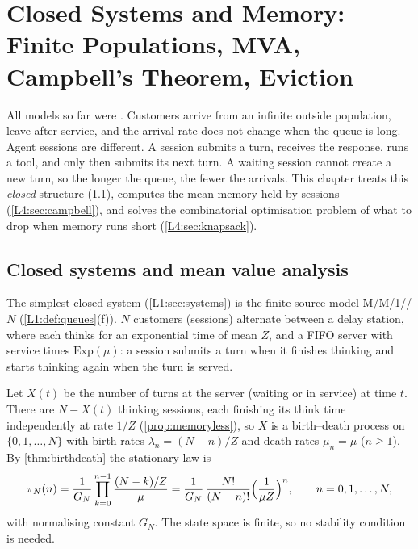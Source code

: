 \chapter{Closed Systems and Memory: Finite Populations, MVA, Campbell's Theorem, Eviction}\label{sec:L4}

All models so far were . Customers arrive from an infinite
outside population, leave after service, and the arrival rate does not change
when the queue is long. Agent sessions are different. A session submits a turn,
receives the response, runs a tool, and only then submits its next turn. A
waiting session cannot create a new turn, so the longer the queue, the fewer the
arrivals. This chapter treats this \emph{closed} structure
(\cref{L4:sec:closed}), computes the mean memory held by sessions
(\cref{L4:sec:campbell}), and solves the combinatorial optimisation problem of
what to drop when memory runs short (\cref{L4:sec:knapsack}).

\section{Closed systems and mean value analysis}\label{L4:sec:closed}

The simplest closed system (\cref{L1:sec:systems}) is the finite-source model
M/M/1//$N$ (\cref{L1:def:queues}(f)). $N$ customers (sessions) alternate between a
delay station, where each thinks for an exponential time of mean $Z$, and a FIFO
server with service times $\mathrm{Exp}(\mu)$: a session submits a turn when it
finishes thinking and starts thinking again when the turn is served.


Let $X(t)$ be the number of turns at the server (waiting or in service) at time
$t$. There are $N-X(t)$ thinking sessions, each finishing its think time
independently at rate $1/Z$ (\cref{prop:memoryless}), so $X$ is a birth--death
process on $\{0,1,\dots,N\}$ with birth rates $\lambda_n=(N-n)/Z$ and death
rates $\mu_n=\mu$ ($n\ge1$). By \cref{thm:birthdeath} the stationary law is
\begin{equation}\label{L4:eq:piN}
  \pi_N(n)=\frac{1}{G_N}\prod_{k=0}^{n-1}\frac{(N-k)/Z}{\mu}
  =\frac{1}{G_N}\,\frac{N!}{(N-n)!}\Bigl(\frac{1}{\mu Z}\Bigr)^{n},
  \qquad n=0,1,\dots,N,
\end{equation}
with normalising constant $G_N$. The state space is finite, so no stability
condition is needed.

